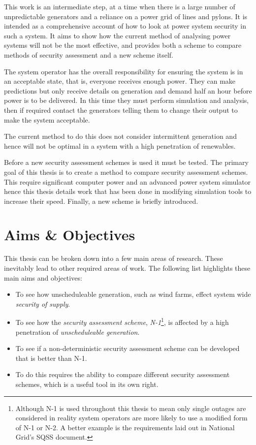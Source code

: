 \documentclass[a4paper,oneside,12pt]{report}
\begin{document}
This work is an intermediate step, at a time when there is a large number of unpredictable generators and a reliance on a power grid of lines and pylons. It is intended as a comprehensive account of how to look at power system security in such a system. It aims to show how the current method of analysing power systems will not be the most effective, and provides both a scheme to compare methods of security assessment and a new scheme itself.

The system operator has the overall responsibility for ensuring the system is in an acceptable state, that is, everyone receives enough power. They can make predictions but only receive details on generation and demand half an hour before power is to be delivered. In this time they must perform simulation and analysis, then if required contact the generators telling them to change their output to make the system acceptable.

The current method to do this does not consider intermittent generation and hence will not be optimal in a system with a high penetration of renewables.

Before a new security assessment schemes is used it must be tested. The primary goal of this thesis is to create a method to compare security assessment schemes. This require significant computer power and an advanced power system simulator hence this thesis details work that has been done in modifying simulation tools to increase their speed. Finally, a new scheme is briefly introduced.

\section{Aims \& Objectives}

This thesis can be broken down into a few main areas of research. These inevitably lead to other required areas of work. The following list highlights these main aims and objectives:

\begin{itemize}
\item To see how unscheduleable generation, such as wind farms, effect system wide \emph{security of supply}.
\item To see how the \emph{security assessment scheme}, \emph{N-1}\footnote{Although N-1 is used throughout this thesis to mean only single outages are considered in reality system operators are more likely to use a modified form of N-1 or N-2. A better example is the requirements laid out in National Grid's SQSS document.}, is affected by a high penetration of \emph{unscheduleable generation}.
\item To see if a non-deterministic security assessment scheme can be developed that is better than N-1.
\item To do this requires the ability to compare different security assessment schemes, which is a useful tool in its own right.
\end{itemize}
\end{document}
